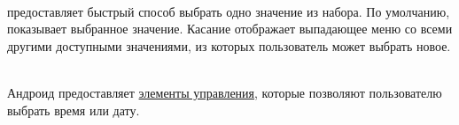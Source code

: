 \\
\Spinner предоставляет быстрый способ выбрать одно значение из набора. По
умолчанию, \Spinner показывает выбранное значение. Касание отображает
выпадающее меню со всеми другими доступными значениями, из которых пользователь
может выбрать новое.


\\
Андроид предоставляет
\href{https://developer.android.com/guide/topics/ui/controls/pickers.html}{элементы управления},
которые позволяют пользователю выбрать время или дату.

